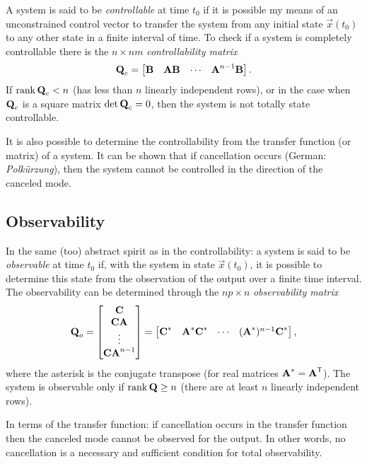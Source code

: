 A system is said to be \emph{controllable} at time \(t_0\) if it is possible my means of an unconstrained control vector to transfer the system from any initial state \(\vec{x}(t_0)\) to any other state in a finite interval of time. To check if a system is completely controllable there is the \(n\times  nm\) \emph{controllability matrix}
\[
	\bm{\mathrm{Q}}_c = \begin{bmatrix}
		\bm{\mathrm{B}} & \bm{\mathrm{A}}\bm{\mathrm{B}} & \cdots & \bm{\mathrm{A}}^{n-1}\bm{\mathrm{B}}
	\end{bmatrix}.
\]
If \(\operatorname{rank} \bm{\mathrm{Q}}_c < n\) (has less than \(n\) linearly independent rows), or in the case when \(\bm{\mathrm{Q}}_c\) is a square matrix \(\det \bm{\mathrm{Q}}_c = 0\), then the system is not totally state controllable.

It is also possible to determine the controllability from the transfer function (or matrix) of a system. It can be shown that if cancellation occurs (German: \textsl{Polkürzung}), then the system cannot be controlled in the direction of the canceled mode.

\subsection{Observability}

In the same (too) abstract spirit as in the controllability: a system is said to be \emph{observable} at time \(t_0\) if, with the system in state \(\vec{x}(t_0)\), it is possible to determine this state from the observation of the output over a finite time interval. The observability can be determined through the \(np \times n\) \emph{observability matrix}
\[
	\bm{\mathrm{Q}}_o = \begin{bmatrix}
		\bm{\mathrm{C}} \\ \bm{\mathrm{C}}\bm{\mathrm{A}} \\ \vdots \\ \bm{\mathrm{C}}\bm{\mathrm{A}}^{n-1}
	\end{bmatrix} = \begin{bmatrix}
		\bm{\mathrm{C}}^* & \bm{\mathrm{A}}^* \bm{\mathrm{C}}^* & \cdots & (\bm{\mathrm{A}}^*)^{n-1}\bm{\mathrm{C}}^*
	\end{bmatrix},
\]
where the asterisk is the conjugate transpose (for real matrices \(\bm{\mathrm{A}}^* = \bm{\mathrm{A}}^\mathsf{T}\)). The system is observable only if \(\operatorname{rank} \bm{\mathrm{Q}} \geq n\) (there are at least \(n\) linearly independent rows).

In terms of the transfer function: if cancellation occurs in the transfer function then the canceled mode cannot be observed for the output. In other words, no cancellation is a necessary and sufficient condition for total observability.

